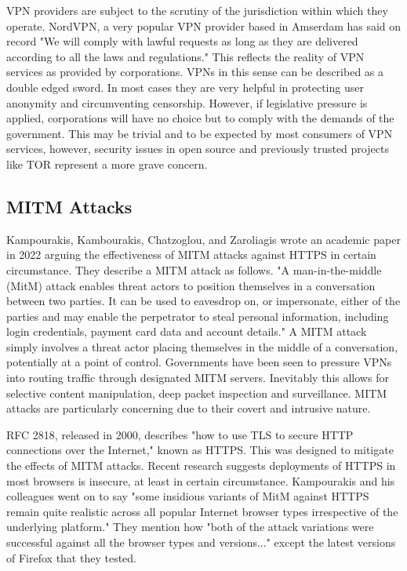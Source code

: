 VPN providers are subject to the scrutiny of the jurisdiction within which they operate. NordVPN, a very popular VPN provider based in Amserdam has said on record "We will comply with lawful requests as long as they are delivered according to all the laws and regulations." This reflects the reality of VPN services as provided by corporations. VPNs in this sense can be described as a double edged sword. In most cases they are very helpful in protecting user anonymity and circumventing censorship. However, if legislative pressure is applied, corporations will have no choice but to comply with the demands of the government. This may be trivial and to be expected by most consumers of VPN services, however, security issues in open source and previously trusted projects like TOR represent a more grave concern. 




\subsection{MITM Attacks}
Kampourakis, Kambourakis, Chatzoglou, and Zaroliagis wrote an academic paper in 2022 arguing the effectiveness of MITM attacks against HTTPS in certain circumstance. They describe a MITM attack as follows. "A man-in-the-middle (MitM) attack enables threat actors to position themselves in a conversation between two parties. It can be used to eavesdrop on, or impersonate, either of the parties and may enable the perpetrator to steal personal information, including login credentials, payment card data and account details."\cite{MITMvHTTPS} A MITM attack simply involves a threat actor placing themselves in the middle of a conversation, potentially at a point of control. Governments have been seen to pressure VPNs into routing traffic through designated MITM servers. Inevitably this allows for selective content manipulation, deep packet inspection and surveillance. MITM attacks are particularly concerning due to their covert and intrusive nature. 

RFC 2818, released in 2000, describes "how to use TLS to secure HTTP connections over the Internet," \cite{rfc2818}known as HTTPS. This was designed to mitigate the effects of MITM attacks. Recent research suggests deployments of HTTPS in most browsers is insecure, at least in certain circumstance. Kampourakis and his colleagues went on to say "some insidious variants of MitM against HTTPS remain quite realistic across all popular Internet browser types irrespective of the underlying platform." \cite{MITMvHTTPS} 
They mention how "both of the attack variations were successful against all the browser types and versions..." except the latest versions of Firefox that they tested.

